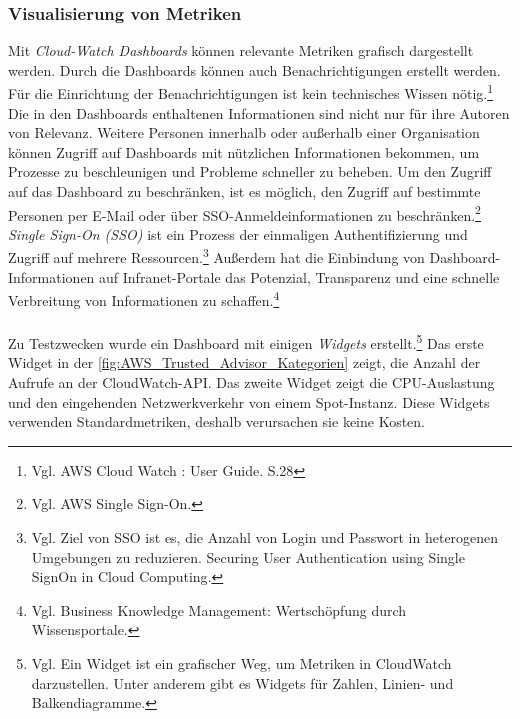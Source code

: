 \subsubsection*{Visualisierung von Metriken}
Mit \textit{Cloud-Watch Dashboards} können relevante Metriken grafisch dargestellt werden. %
Durch die Dashboards können auch Benachrichtigungen erstellt werden. Für die Einrichtung der Benachrichtigungen ist kein technisches Wissen nötig.\footnote{Vgl. AWS Cloud Watch : User Guide. S.28\cite{AMZ14}}
Die in den Dashboards enthaltenen Informationen sind nicht nur für ihre Autoren von Relevanz. Weitere Personen innerhalb oder außerhalb einer Organisation können Zugriff auf Dashboards mit nützlichen Informationen bekommen, um Prozesse zu beschleunigen und Probleme schneller zu beheben. Um den Zugriff auf das Dashboard zu beschränken, ist es möglich, den Zugriff auf bestimmte Personen per E-Mail oder über SSO-Anmeldeinformationen zu beschränken.\footnote{Vgl.  AWS Single Sign-On.\cite{AMZ33}}  \textit{Single Sign-On (SSO)} ist ein Prozess der einmaligen Authentifizierung und Zugriff auf mehrere Ressourcen.\footnote{Vgl. Ziel von SSO ist es, die Anzahl von Login und Passwort in heterogenen Umgebungen zu reduzieren. Securing User Authentication using Single SignOn in Cloud Computing\cite{SSO}.} Außerdem hat die Einbindung von Dashboard-Informationen auf Infranet-Portale das Potenzial, Transparenz und eine schnelle Verbreitung von Informationen zu schaffen.\footnote{Vgl. Business Knowledge Management: Wertschöpfung durch Wissensportale\cite{BKM}.}
\\\\
Zu Testzwecken wurde ein Dashboard mit einigen \textit{Widgets} erstellt.\footnote{Vgl. Ein Widget ist ein grafischer Weg, um Metriken in CloudWatch darzustellen. Unter anderem gibt es Widgets für Zahlen, Linien- und Balkendiagramme.} Das erste Widget in der \autoref{fig:AWS_Trusted_Advisor_Kategorien} zeigt, %
die Anzahl der Aufrufe an der CloudWatch-API. %
Das zweite Widget zeigt die CPU-Auslastung und den eingehenden Netzwerkverkehr von einem Spot-Instanz. Diese Widgets verwenden Standardmetriken, deshalb verursachen sie keine Kosten. 
